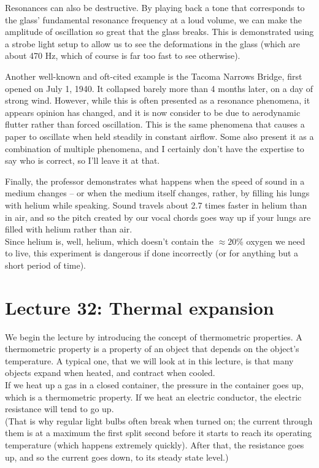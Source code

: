 Resonances can also be destructive. By playing back a tone that corresponds to the glass' fundamental resonance frequency at a loud volume, we can make the amplitude of oscillation so great that the glass breaks. This is demonstrated using a strobe light setup to allow us to see the deformations in the glass (which are about 470 Hz, which of course is far too fast to see otherwise).

Another well-known and oft-cited example is the Tacoma Narrows Bridge, first opened on July 1, 1940. It collapsed barely more than 4 months later, on a day of strong wind. However, while this is often presented as a resonance phenomena, it appears opinion has changed, and it is now consider to be due to aerodynamic flutter rather than forced oscillation. This is the same phenomena that causes a paper to oscillate when held steadily in constant airflow. Some also present it as a combination of multiple phenomena, and I certainly don't have the expertise to say who is correct, so I'll leave it at that.

Finally, the professor demonstrates what happens when the speed of sound in a medium changes -- or when the medium itself changes, rather, by filling his lungs with helium while speaking. Sound travels about 2.7 times faster in helium than in air, and so the pitch created by our vocal chords goes way up if your lungs are filled with helium rather than air.\\
Since helium is, well, helium, which doesn't contain the $\approx 20$\% oxygen we need to live, this experiment is dangerous if done incorrectly (or for anything but a short period of time).

\section{Lecture 32: Thermal expansion}

We begin the lecture by introducing the concept of thermometric properties. A thermometric property is a property of an object that depends on the object's temperature. A typical one, that we will look at in this lecture, is that many objects expand when heated, and contract when cooled.\\
If we heat up a gas in a closed container, the pressure in the container goes up, which is a thermometric property. If we heat an electric conductor, the electric resistance will tend to go up.\\
(That is why regular light bulbs often break when turned on; the current through them is at a maximum the first split second before it starts to reach its operating temperature (which happens extremely quickly). After that, the resistance goes up, and so the current goes down, to its steady state level.)


